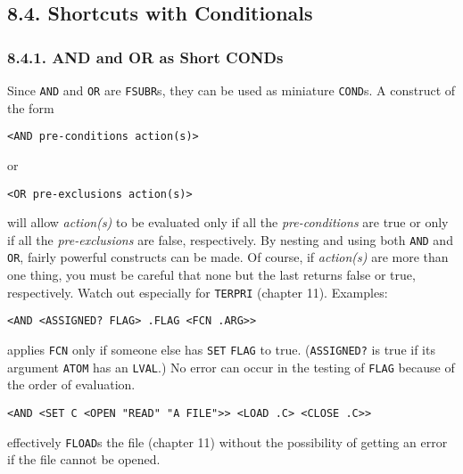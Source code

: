 \documentclass[a4paper,]{article}
\begin{document}
\subsection{8.4. Shortcuts with Conditionals}\label{shortcuts-with-conditionals}

\subsubsection{8.4.1. AND and OR as Short CONDs}\label{and-and-or-as-short-conds}

Since \texttt{AND}  and \texttt{OR} are \texttt{FSUBR}s, they can be used as
miniature \texttt{COND}s. A construct of the form

\begin{verbatim}
<AND pre-conditions action(s)>
\end{verbatim}

or

\begin{verbatim}
<OR pre-exclusions action(s)>
\end{verbatim}

will allow \emph{action(s)} to be evaluated only if all the \emph{pre-conditions} are true or only if all the
\emph{pre-exclusions} are false, respectively. By nesting and using both \texttt{AND} and \texttt{OR}, fairly powerful
constructs can be made. Of course, if \emph{action(s)} are more than one thing, you must be careful that none but the last
returns false or true, respectively. Watch out especially for \texttt{TERPRI} (chapter 11).
Examples:

\begin{verbatim}
<AND <ASSIGNED? FLAG> .FLAG <FCN .ARG>>
\end{verbatim}

 applies \texttt{FCN} only if someone else has \texttt{SET} \texttt{FLAG} to true.
(\texttt{ASSIGNED?} is true if its argument \texttt{ATOM} has an \texttt{LVAL}.) No error can occur in the testing of
\texttt{FLAG} because of the order of evaluation.

\begin{verbatim}
<AND <SET C <OPEN "READ" "A FILE">> <LOAD .C> <CLOSE .C>>
\end{verbatim}

effectively \texttt{FLOAD}s the file (chapter 11) without the possibility of getting an error if the
file cannot be opened.
\end{document}
